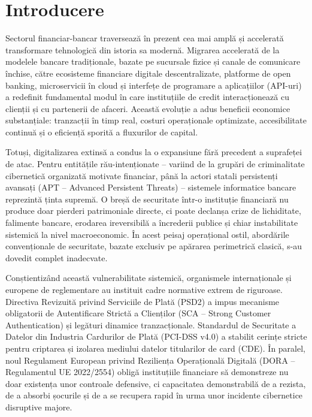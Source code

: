 \chapter*{Introducere}

Sectorul financiar-bancar traversează în prezent cea mai amplă și accelerată transformare tehnologică din istoria sa modernă. Migrarea accelerată de la modelele bancare tradiționale, bazate pe sucursale fizice și canale de comunicare închise, către ecosisteme financiare digitale descentralizate, platforme de open banking, microservicii în cloud și interfețe de programare a aplicațiilor (API-uri) a redefinit fundamental modul în care instituțiile de credit interacționează cu clienții și cu partenerii de afaceri. Această evoluție a adus beneficii economice substanțiale: tranzacții în timp real, costuri operaționale optimizate, accesibilitate continuă și o eficiență sporită a fluxurilor de capital.

Totuși, digitalizarea extinsă a condus la o expansiune fără precedent a suprafeței de atac. Pentru entitățile rău-intenționate – variind de la grupări de criminalitate cibernetică organizată motivate financiar, până la actori statali persistenți avansați (APT – Advanced Persistent Threats) – sistemele informatice bancare reprezintă ținta supremă. O breșă de securitate într-o instituție financiară nu produce doar pierderi patrimoniale directe, ci poate declanșa crize de lichiditate, falimente bancare, erodarea ireversibilă a încrederii publice și chiar instabilitate sistemică la nivel macroeconomic. În acest peisaj operațional ostil, abordările convenționale de securitate, bazate exclusiv pe apărarea perimetrică clasică, s-au dovedit complet inadecvate.

Conștientizând această vulnerabilitate sistemică, organismele internaționale și europene de reglementare au instituit cadre normative extrem de riguroase. Directiva Revizuită privind Serviciile de Plată (PSD2) a impus mecanisme obligatorii de Autentificare Strictă a Clienților (SCA – Strong Customer Authentication) și legături dinamice tranzacționale. Standardul de Securitate a Datelor din Industria Cardurilor de Plată (PCI-DSS v4.0) a stabilit cerințe stricte pentru criptarea și izolarea mediului datelor titularilor de card (CDE). În paralel, noul Regulament European privind Reziliența Operațională Digitală (DORA – Regulamentul UE 2022/2554) obligă instituțiile financiare să demonstreze nu doar existența unor controale defensive, ci capacitatea demonstrabilă de a rezista, de a absorbi șocurile și de a se recupera rapid în urma unor incidente cibernetice disruptive majore.

